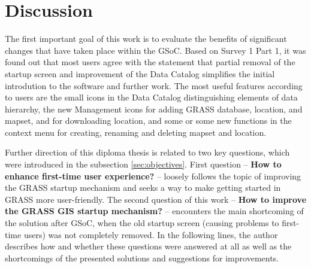 \documentclass[a4paper,10pt,twoside]{article}
\begin{document}
\newpage
\vspace*{-1cm}
\section*{Discussion}
\noindent
\large

\noindent The first important goal of this work is to evaluate the benefits of significant changes that have taken place within the GSoC. Based on Survey 1 Part 1, it was found out that most users agree with the statement that partial removal of the startup screen and improvement of the Data Catalog simplifies the initial introdution to the software and further work. The most useful features according to users are the small icons in the Data Catalog distinguishing elements of data hierarchy, the new Management icons for adding GRASS database, location, and mapset, and for downloading location, and some or some new functions in the context menu for creating, renaming and deleting mapset and location.

Further direction of this diploma thesis is related to two key questions, which were introduced in the subsection \ref{sec:objectives}. First question -- \textbf{How to enhance first-time user experience?} -- loosely follows the topic of improving the GRASS startup mechanism and seeks a way to make getting started in GRASS more user-friendly. The second question of this work -- \textbf{How to improve the GRASS GIS startup mechanism?} -- encounters the main shortcoming of the solution after GSoC, when the old startup screen (causing problems to first-time users) was not completely removed. In the following lines, the author describes how and whether these questions were answered at all as well as the shortcomings of the presented solutions and suggestions for improvements.
\end{document}
